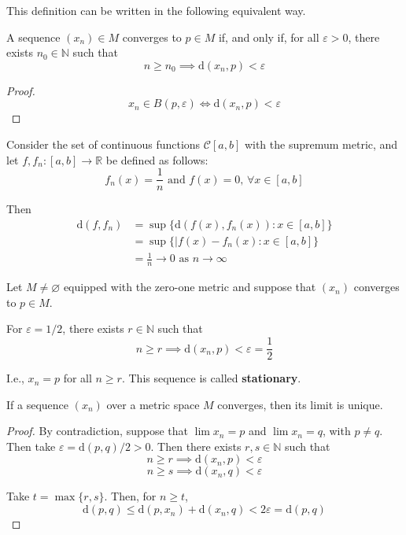 This definition can be written in the following equivalent way.

\begin{proposition}
	A sequence $(x_n) \in M$ converges to $p \in M$ if, and only if, for all $\varepsilon > 0$, there exists $n_0 \in \mathbb{N}$ such that 
	\[
		n \geq n_0 \implies \mathrm{d}(x_n, p) < \varepsilon
	\]
\end{proposition}	

\begin{proof}
	\[
		x_n \in B(p, \varepsilon) \iff \mathrm{d}(x_n, p) < \varepsilon
	\]
\end{proof}

\begin{example}
	Consider the set of continuous functions $\mathcal{C}[a,b]$ with the supremum metric, and let $f, f_n:[a,b] \longrightarrow \mathbb{R}$ be defined as follows:
	\[
		f_n(x) = \frac{1}{n} \text{ and } f(x) = 0, \, \forall x \in [a,b]
	\]

	Then
	\begin{equation*}
		\begin{aligned}
			\mathrm{d}(f,f_n) 	&= \sup \{ \mathrm{d}(f(x),f_n(x)) : x \in [a,b] \} \\
								&= \sup \{|f(x) - f_n(x) : x \in [a,b] \} \\
								&= \frac{1}{n} \longrightarrow 0 \text{ as } n \to \infty
		\end{aligned}
	\end{equation*}
\end{example}

\begin{example}
	Let $M \neq \varnothing$ equipped with the zero-one metric and suppose that $(x_n)$ converges to $p \in M$.

	For $\varepsilon = 1/2$, there exists $r \in \mathbb{N}$ such that
	\[
		n \geq r \implies \mathrm{d}(x_n,p) < \varepsilon = \frac{1}{2}
	\]

	I.e., $x_n = p$ for all $n \geq r$. This sequence is called \textbf{stationary}.
\end{example}

\begin{proposition}
	If a sequence $(x_n)$ over a metric space $M$ converges, then its limit is unique.
\end{proposition}

\begin{proof}
	By contradiction, suppose that $\lim x_n = p$ and $\lim x_n = q$, with $p \neq q$. Then take $\varepsilon = \mathrm{d}(p,q)/2 > 0$. Then there exists $r, s \in \mathbb{N}$ such that 
	\[
		n \geq r \implies \mathrm{d}(x_n, p) < \varepsilon
	\]
	\[
		n \geq s \implies \mathrm{d}(x_n, q) < \varepsilon
	\]

	Take $t = \max \{r, s\}$. Then, for $n \geq t$, 
	\[
		\mathrm{d}(p,q) \leq \mathrm{d}(p, x_n) + \mathrm{d}(x_n, q) < 2 \varepsilon = \mathrm{d}(p,q)
	\]
\end{proof}

